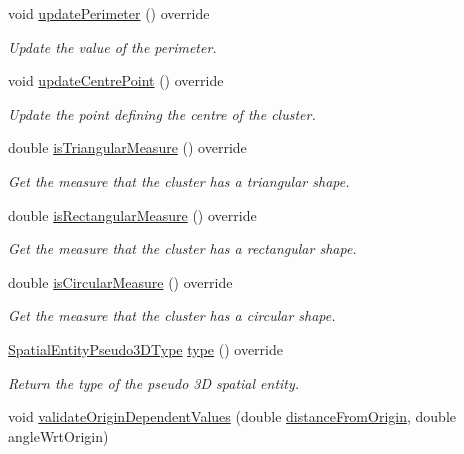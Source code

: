 \begin{DoxyCompactItemize}
void \hyperlink{classmultiscale_1_1analysis_1_1Cluster_aadc520e4459f1ea6e22afd7c02d5f2ed}{update\-Perimeter} () override
\begin{DoxyCompactList}\small\item\em \-Update the value of the perimeter. \end{DoxyCompactList}\item 
void \hyperlink{classmultiscale_1_1analysis_1_1Cluster_a1991d68cc9e76dab54c134df6beb59cb}{update\-Centre\-Point} () override
\begin{DoxyCompactList}\small\item\em \-Update the point defining the centre of the cluster. \end{DoxyCompactList}\item 
double \hyperlink{classmultiscale_1_1analysis_1_1Cluster_a28efcf050af76acb01619b36505b662e}{is\-Triangular\-Measure} () override
\begin{DoxyCompactList}\small\item\em \-Get the measure that the cluster has a triangular shape. \end{DoxyCompactList}\item 
double \hyperlink{classmultiscale_1_1analysis_1_1Cluster_aca93cb46704a3e824151e99b7a53d20d}{is\-Rectangular\-Measure} () override
\begin{DoxyCompactList}\small\item\em \-Get the measure that the cluster has a rectangular shape. \end{DoxyCompactList}\item 
double \hyperlink{classmultiscale_1_1analysis_1_1Cluster_a579730478055ae93d659f268375a492d}{is\-Circular\-Measure} () override
\begin{DoxyCompactList}\small\item\em \-Get the measure that the cluster has a circular shape. \end{DoxyCompactList}\item 
\hyperlink{namespacemultiscale_1_1analysis_a8f337e7ea9c75ff3ff2b3fe76fe7b5b6}{\-Spatial\-Entity\-Pseudo3\-D\-Type} \hyperlink{classmultiscale_1_1analysis_1_1Cluster_a0a4531d371662e9c4149c10aa115fb49}{type} () override
\begin{DoxyCompactList}\small\item\em \-Return the type of the pseudo 3\-D spatial entity. \end{DoxyCompactList}\item 
void \hyperlink{classmultiscale_1_1analysis_1_1Cluster_a26b9c11e63bfdbfc837a35f68c5c40dd}{validate\-Origin\-Dependent\-Values} (double \hyperlink{classmultiscale_1_1analysis_1_1SpatialEntityPseudo3D_a056f67b90ed41c0e6dc4df31b71ad906}{distance\-From\-Origin}, double angle\-Wrt\-Origin)

\end{DoxyCompactItemize}
